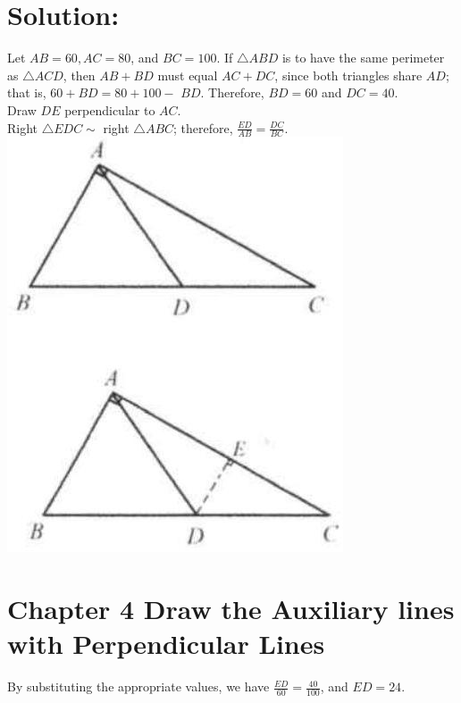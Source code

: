 \documentclass[10pt]{article}
\begin{document}
\section*{Solution:}
Let \(A B=60, A C=80\), and \(B C=100\). If \(\triangle A B D\) is to have the same perimeter as \(\triangle A C D\), then \(A B+B D\) must equal \(A C+D C\), since both triangles share \(A D\); that is, \(60+B D=80+100-\) \(B D\). Therefore, \(B D=60\) and \(D C=40\).\\
Draw \(D E\) perpendicular to \(A C\).\\
Right \(\triangle E D C \sim\) right \(\triangle A B C\); therefore, \(\frac{E D}{A B}=\frac{D C}{B C}\).\\
\includegraphics[max width=\textwidth, center]{2025_04_17_97bc1f7e44d93c271a88g-083(2)}

\section*{Chapter 4 Draw the Auxiliary lines with Perpendicular Lines}
By substituting the appropriate values, we have \(\frac{E D}{60}=\frac{40}{100}\), and \(E D=24\).
\end{document}
